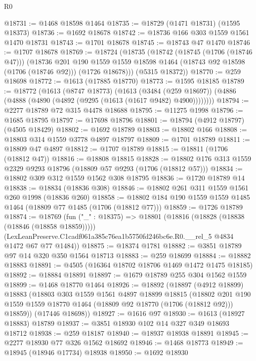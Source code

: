 \begin{lexlean}{R0}
\begin{coremodule}
@18731 := @1468 @18598 @1464
@18735 := @18729 (@1471 @18731) (@1595 @18373)
@18736 := @1692 @18678
@18742 := @18736 @166 @303 @1559 @1561 @1470 @18731
@18743 := @1701 @18678
@18745 := @18743 @47 @1470
@18746 := @1707 @18678
@18769 := @18724
    (@18735
      (@18742
        (@18745 (@1706 (@18746 @47)))
        (@18736
          @201
          @190
          @1559
          @1559
          @18598
          @1464
          (@18743 @92 @18598 (@1706 (@18746 @92)))
          (@1726 @18678)))
      (@5315 @18372))
@18770 := @259 @18698
@18772 := @1613 (@17885 @18770)
@18773 := @1595 @18185
@18789 := @18772
    (@1613
      (@8747 @18773)
      (@1613
        (@3484 (@259 @18697))
        (@4886 (@4888 (@4890 (@4892 (@9295 (@1613 (@1617 @9482) @4900))))))))
@18794 := @2277 @18789 @72 @315 @4478 @18688
@18795 := @11275 @1998
@18796 := @1685 @18795
@18797 := @17698 @18796
@18801 := @18794 (@4912 @18797) (@4505 @18429)
@18802 := @1692 @18789
@18803 := @18802 @166
@18808 := @18803 @314 @1559 @3778 @4897 @18797
@18809 := @1701 @18789
@18811 := @18809 @47 @4897
@18812 := @1707 @18789
@18815 := @18811 (@1706 (@18812 @47))
@18816 := @18808 @18815
@18828 := @18802 @176 @313 @1559 @2329 @9293 @18796 (@18809 @57 @9293 (@1706 (@18812 @57)))
@18834 := @18802 @309 @312 @1559 @1562 @308 @18795
@18836 := @1720 @18789 @14
@18838 := @18834 (@18836 @308)
@18846 := @18802 @261 @311 @1559 @1561 @260 @1998 (@18836 @260)
@18858 := @18802 @184 @190 @1559 @1559 @1485 @1464 (@18809 @77 @1485 (@1706 (@18812 @77)))
@18859 := @1726 @18789
@18874 := @18769
    (fun ("_" : @18375) =>
    @18801
      (@18816 (@18828 (@18838 (@18846 (@18858 @18859)))))
      (LexLeanPreserve.C1cadf061a385c76ea1b5750fd246bc6e.R0.__rel_5 @4834 @1472 @67 @77 @1484))
@18875 := @18374 @1781
@18882 := @3851 @18789 @97 @14 @320 @350 @1564 @18713
@18883 := @259 @18699
@18884 := @18882 @18883
@18891 := @4505 (@16364 @18702 @18706 @1469 @1472 @1475 @18185)
@18892 := @18884 @18891
@18897 := @1679 @18789 @255 @304 @1562 @1559
@18899 := @1468 @18770 @1464
@18926 := @18892
    (@18897
      (@4912 @18899)
      @18883
      (@18803
        @303
        @1559
        @1561
        @4897
        @18899
        @18815
        (@18802 @201 @190 @1559 @1559 @18770 @1464 (@18809 @92 @18770 (@1706 (@18812 @92))) @18859))
      (@17446 @18698))
@18927 := @1616 @97
@18930 := @1613 (@18927 @18883) @18789
@18937 := @3851 @18930 @102 @14 @327 @349 @18693 @18712
@18938 := @259 @18187
@18940 := @18937 @18938 @18891
@18945 := @2277 @18930 @77 @326 @1562 @18692
@18946 := @1468 @18773
@18949 := @18945 (@18946 @17734) @18938
@18950 := @1692 @18930

\end{coremodule}
\end{lexlean}
